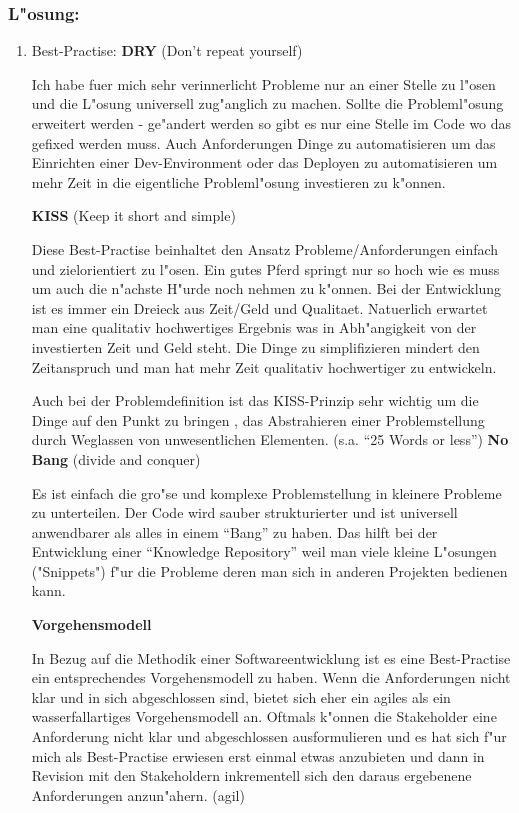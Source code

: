 \subsubsection*{L"osung:}
\begin{enumerate}
\item Best-Practise:
\smallbreak
\textbf{DRY} (Don't repeat yourself)

Ich habe fuer mich sehr verinnerlicht Probleme nur an einer Stelle zu l"osen und die L"osung universell zug"anglich zu machen. Sollte die Probleml"osung erweitert werden - ge"andert werden so gibt es nur eine Stelle im Code wo das gefixed werden muss.
Auch Anforderungen Dinge zu automatisieren um das Einrichten einer Dev-Environment oder das Deployen zu automatisieren um mehr Zeit in die eigentliche Probleml"osung investieren zu k"onnen.

\textbf{KISS} (Keep it short and simple)

Diese Best-Practise beinhaltet den Ansatz Probleme/Anforderungen einfach und zielorientiert zu l"osen. Ein gutes Pferd springt nur so hoch wie es muss um auch die n"achste H"urde noch nehmen zu k"onnen.
Bei der Entwicklung ist es immer ein Dreieck aus Zeit/Geld und Qualitaet. Natuerlich erwartet man eine qualitativ hochwertiges Ergebnis was in Abh"angigkeit von der investierten Zeit und Geld steht.
Die Dinge zu simplifizieren mindert den Zeitanspruch und man hat mehr Zeit qualitativ hochwertiger zu entwickeln.

Auch bei der Problemdefinition ist das KISS-Prinzip sehr wichtig um die Dinge auf den Punkt zu bringen , das Abstrahieren einer Problemstellung durch Weglassen von unwesentlichen Elementen. (s.a. ``25 Words or less'')
\newpage
\textbf{No Bang} (divide and conquer)

Es ist einfach die gro"se und komplexe Problemstellung in kleinere Probleme zu unterteilen. Der Code wird sauber strukturierter und ist universell anwendbarer als alles in einem ``Bang'' zu haben. Das hilft bei der Entwicklung einer ``Knowledge Repository'' weil man viele kleine L"osungen ("Snippets") f"ur die Probleme deren man sich in anderen Projekten bedienen kann.

\textbf{Vorgehensmodell}

In Bezug auf die Methodik einer Softwareentwicklung ist es eine Best-Practise ein entsprechendes Vorgehensmodell zu haben. Wenn die Anforderungen nicht klar und in sich abgeschlossen sind, bietet sich eher ein agiles als ein wasserfallartiges Vorgehensmodell an.
Oftmals k"onnen die Stakeholder eine Anforderung nicht klar und abgeschlossen ausformulieren und es hat sich f"ur mich als Best-Practise erwiesen erst einmal etwas anzubieten und dann in Revision mit den Stakeholdern inkrementell sich den daraus ergebenene Anforderungen anzun"ahern. (agil)


\end{enumerate}
